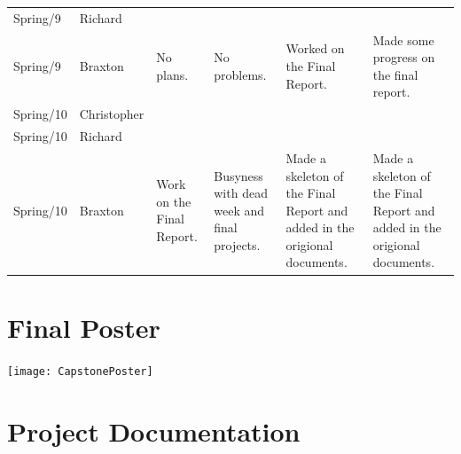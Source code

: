 \documentclass[onecolumn, draftclsnofoot,10pt, compsoc]{IEEEtran}
\begin{document}
\begin{tiny}
\begin{longtable}{ | p{} | p{} | p{} | p{} | p{} | p{} | }
&

&

&

\\ \hline
Spring/9 & Richard & 

&

&

&

\\ \hline
Spring/9 & Braxton & 

No plans.

&

No problems.

&

Worked on the Final Report.

&

Made some progress on the final report.

\\ \hline
Spring/10 & Christopher & 

&

&

&

\\ \hline
Spring/10 & Richard & 

&

&

&

\\ \hline
Spring/10 & Braxton & 

Work on the Final Report.

&

Busyness with dead week and final projects.

&

Made a skeleton of the Final Report and added in the origional documents.

&

Made a skeleton of the Final Report and added in the origional documents.

\\ \hline
\hline 
\end{longtable}
\end{tiny}


\section{Final Poster}
\texttt{[image: CapstonePoster]}


\section{Project Documentation}
\end{document}
